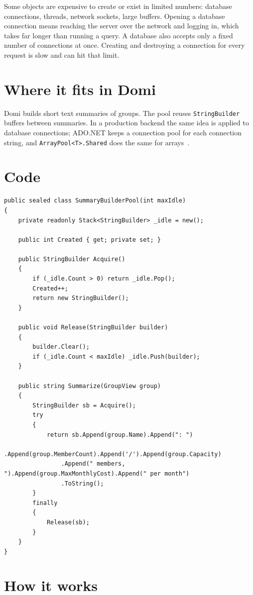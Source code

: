 \documentclass{utmreport}
\providecommand{\passthrough}[1]{#1}
\begin{document}
Some objects are expensive to create or exist in limited numbers: database connections, threads, network sockets, large buffers. Opening a database connection means reaching the server over the network and logging in, which takes far longer than running a query. A database also accepts only a fixed number of connections at once. Creating and destroying a connection for every request is slow and can hit that limit.

\section{Where it fits in Domi}

Domi builds short text summaries of groups. The pool reuses \passthrough{\lstinline!StringBuilder!} buffers between summaries. In a production backend the same idea is applied to database connections; ADO.NET keeps a connection pool for each connection string, and \passthrough{\lstinline!ArrayPool<T>.Shared!} does the same for arrays~\cite{arraypool}.

\section{Code}

\begin{lstlisting}
public sealed class SummaryBuilderPool(int maxIdle)
{
    private readonly Stack<StringBuilder> _idle = new();

    public int Created { get; private set; }

    public StringBuilder Acquire()
    {
        if (_idle.Count > 0) return _idle.Pop();
        Created++;
        return new StringBuilder();
    }

    public void Release(StringBuilder builder)
    {
        builder.Clear();
        if (_idle.Count < maxIdle) _idle.Push(builder);
    }

    public string Summarize(GroupView group)
    {
        StringBuilder sb = Acquire();
        try
        {
            return sb.Append(group.Name).Append(": ")
                .Append(group.MemberCount).Append('/').Append(group.Capacity)
                .Append(" members, ").Append(group.MaxMonthlyCost).Append(" per month")
                .ToString();
        }
        finally
        {
            Release(sb);
        }
    }
}
\end{lstlisting}

\section{How it works}
\end{document}
